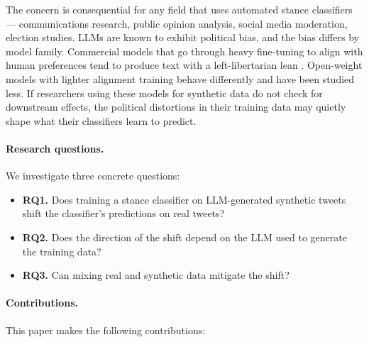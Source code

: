 \documentclass[11pt]{article}
\begin{document}
The concern is consequential for any field that uses automated stance classifiers --- communications research, public opinion analysis, social media moderation, election studies. LLMs are known to exhibit political bias, and the bias differs by model family. Commercial models that go through heavy fine-tuning to align with human preferences tend to produce text with a left-libertarian lean \citep{santurkar2023whose, rottger2024political}. Open-weight models with lighter alignment training behave differently and have been studied less. If researchers using these models for synthetic data do not check for downstream effects, the political distortions in their training data may quietly shape what their classifiers learn to predict.

\paragraph{Research questions.} We investigate three concrete questions:

\begin{itemize}
    \item \textbf{RQ1.} Does training a stance classifier on LLM-generated synthetic tweets shift the classifier's predictions on real tweets?
    \item \textbf{RQ2.} Does the direction of the shift depend on the LLM used to generate the training data?
    \item \textbf{RQ3.} Can mixing real and synthetic data mitigate the shift?
\end{itemize}

\paragraph{Contributions.} This paper makes the following contributions:
\end{document}
